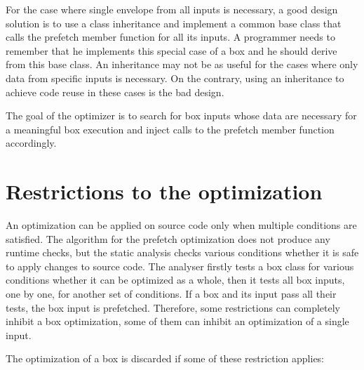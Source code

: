 For the case where single envelope from all inputs is necessary, a good design solution is to use a class inheritance and implement a common base class that calls the prefetch member function for all its inputs. A programmer needs to remember that he implements this special case of a box and he should derive from this base class. An inheritance may not be as useful for the cases where only data from specific inputs is necessary. On the contrary, using an inheritance to achieve code reuse in these cases is the bad design.

The goal of the optimizer is to search for box inputs whose data are necessary for a meaningful box execution and inject calls to the prefetch member function accordingly.

\section{Restrictions to the optimization}
\label{prefetch-restrictions}
An optimization can be applied on source code only when multiple conditions are satisfied. The algorithm for the prefetch optimization does not produce any runtime checks, but the static analysis checks various conditions whether it is safe to apply changes to source code. The analyser firstly tests a box class for various conditions whether it can be optimized as a whole, then it tests all box inputs, one by one, for another set of conditions. If a box and its input pass all their tests, the box input is prefetched. Therefore, some restrictions can completely inhibit a box optimization, some of them can inhibit an optimization of a single input.

The optimization of a box is discarded if some of these restriction applies:

